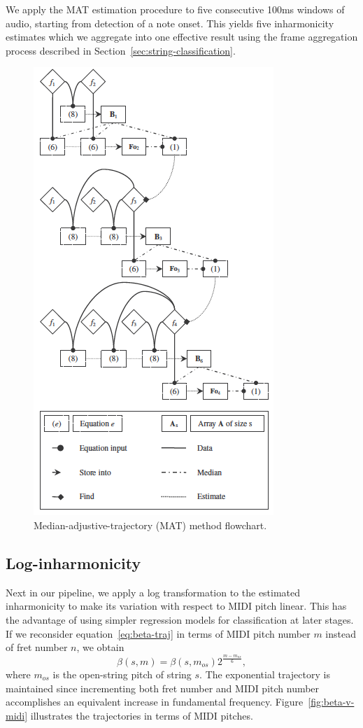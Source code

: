 \documentclass[12pt]{cmuthesis}
\begin{document}
We apply the MAT estimation procedure to five consecutive 100ms windows of audio, starting from detection of a note onset. This yields five inharmonicity estimates which we aggregate into one effective result using the frame aggregation process described in Section~\ref{sec:string-classification}.
\begin{figure}[!htbp] 
\label{fig:mat-flowchart}
\centering
\includegraphics[scale=0.9]{mat-flowchart}
\caption{Median-adjustive-trajectory (MAT) method flowchart.}
\end{figure}

\subsection{Log-inharmonicity}
Next in our pipeline, we apply a log transformation to the estimated inharmonicity to make its variation with respect to MIDI pitch linear. This has the advantage of using simpler regression models for classification at later stages. If we reconsider equation~\eqref{eq:beta-traj} in terms of MIDI pitch number $m$ instead of fret number $n$, we obtain
\begin{equation}
\beta(s,m) = \beta(s,m_{os})2^{\frac{m-m_{os}}{6}},
\end{equation}
where $m_{os}$ is the open-string pitch of string $s$. The exponential trajectory is maintained since incrementing both fret number and MIDI pitch number accomplishes an equivalent increase in fundamental frequency. Figure~\ref{fig:beta-v-midi} illustrates the trajectories in terms of MIDI pitches.
\end{document}
